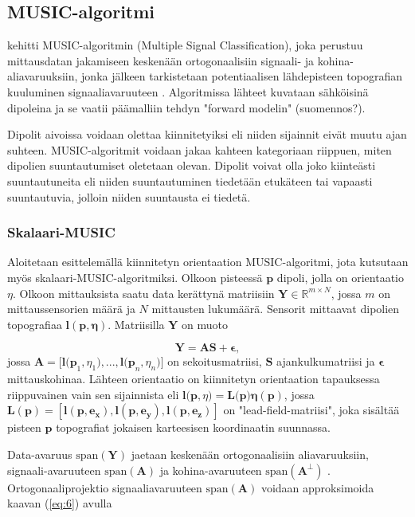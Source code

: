 \subsection{MUSIC-algoritmi}
\cite{Schmidt1986MultipleEstimation} kehitti MUSIC-algoritmin (Multiple Signal Classification), joka perustuu mittausdatan jakamiseen keskenään ortogonaalisiin signaali- ja kohina-aliavaruuksiin, jonka jälkeen tarkistetaan potentiaalisen lähdepisteen topografian kuuluminen signaaliavaruuteen \citep{Mosher1999SourceMUSIC}. Algoritmissa lähteet kuvataan sähköisinä dipoleina ja se vaatii päämalliin tehdyn "forward modelin" (suomennos?).

Dipolit aivoissa voidaan olettaa kiinnitetyiksi eli niiden sijainnit eivät muutu ajan suhteen. MUSIC-algoritmit voidaan jakaa kahteen kategoriaan riippuen, miten dipolien suuntautumiset oletetaan olevan. Dipolit voivat olla joko kiinteästi suuntautuneita eli niiden suuntautuminen tiedetään etukäteen tai vapaasti suuntautuvia, jolloin niiden suuntausta ei tiedetä. \citep{Makela2018TruncatedLocalization} 

\subsubsection{Skalaari-MUSIC}
Aloitetaan esittelemällä kiinnitetyn orientaation MUSIC-algoritmi, jota kutsutaan myös skalaari-MUSIC-algoritmiksi. Olkoon pisteessä $\mathbf{p}$ dipoli, jolla on orientaatio $\eta$. Olkoon mittauksista saatu data kerättynä matriisiin $\mathbf{Y}\in \mathbb{R}^{m\times N}$, jossa $\mathit{m}$ on mittaussensorien määrä ja $\mathit{N}$ mittausten lukumäärä. Sensorit mittaavat dipolien topografiaa $\mathbf{l(p,\eta)}$. Matriisilla $\mathbf{Y}$ on muoto

\begin{equation}
    \mathbf{Y=AS+\epsilon},
\end{equation}
jossa $\mathbf{A =[l(p}_1,\eta_1),...,\mathbf{l(p}_n,\eta_n)]$ on sekoitusmatriisi, $\mathbf{S}$ ajankulkumatriisi ja $\mathbf{\epsilon}$ mittauskohinaa. Lähteen orientaatio on kiinnitetyn orientaation tapauksessa riippuvainen vain sen sijainnista eli $\mathbf{l(p},\eta)=\mathbf{L(p})\mathbf{\eta}(\mathbf{p})$, jossa $\mathbf{L(p) = [l(p,e_x),l(p,e_y),l(p,e_z)]}$ on "lead-field-matriisi", joka sisältää pisteen $\mathbf{p}$ topografiat jokaisen karteesisen koordinaatin suunnassa. 

Data-avaruus $\text{span}(\mathbf{Y})$ jaetaan keskenään ortogonaalisiin aliavaruuksiin, signaali-avaruuteen $\text{span}(\mathbf{A})$  ja kohina-avaruuteen $\text{span}(\mathbf{A^\bot})$  \citep{Mosher1999SourceMUSIC}. Ortogonaaliprojektio signaaliavaruuteen $\text{span}(\mathbf{A})$ voidaan approksimoida kaavan (\ref{eq:6}) avulla

